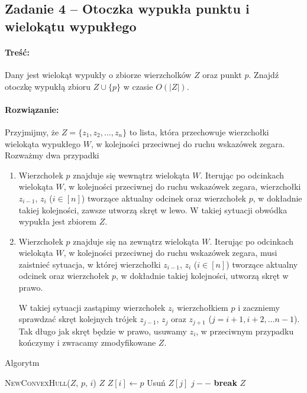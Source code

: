\subsection{Zadanie 4 -- Otoczka wypukła punktu i wielokątu wypukłego}
\paragraph{Treść:} Dany jest wielokąt wypukły o zbiorze wierzcholków $Z$ oraz punkt $p$. Znajdź otoczkę wypukłą zbioru $Z \cup \{p\}$ w czasie $O(|Z|)$.
\paragraph{Rozwiązanie:}
Przyjmijmy, że $Z = \{z_1, z_2, \ldots, z_n\}$ to lista, która przechowuje wierzchołki
wielokąta wypukłego $W$, w kolejności przeciwnej do ruchu wskazówek zegara.
Rozważmy dwa przypadki
\begin{enumerate}
	\item Wierzchołek $p$ znajduje się wewnątrz wielokąta $W$. Iterując po odcinkach
	wielokąta $W$, w kolejności przeciwnej do ruchu wskazówek zegara, wierzchołki
	$z_{i-1}$, $z_i$ ($i \in [n]$) tworzące aktualny odcinek oraz wierzchołek $p$, w dokładnie takiej kolejności, zawsze utworzą skręt w lewo. W takiej sytuacji obwódka wypukła jest zbiorem $Z$.
	
	\item Wierzchołek $p$ znajduje się na zewnątrz wielokąta $W$. Iterując po odcinkach
	wielokąta $W$, w kolejności przeciwnej do ruchu wskazówek zegara, musi zaistnieć sytuacja, w której wierzchołki
	$z_{i-1}$, $z_i$ ($i \in [n]$) tworzące aktualny odcinek oraz wierzchołek $p$, w dokładnie takiej kolejności, utworzą skręt w prawo.
	
	W takiej sytuacji zastąpimy wierzchołek $z_i$ wierzchołkiem $p$ i zaczniemy 
	sprawdzać skręt kolejnych trójek $z_{j-1}$, $z_j$ oraz $z_{j+1}$
	($j = i + 1, i + 2, \dots n - 1$). Tak długo
	jak skręt będzie w prawo, usuwamy $z_i$, w przeciwnym przypadku kończymy i zwracamy zmodyfikowane $Z$.
\end{enumerate}

\begin{algorithm}[H]
	\caption{Algorytm }
	\begin{algorithmic}[1]
		\State \Return \textsc{NewConvexHull}($Z$, $p$, $i$)
		\EndIf
		\EndFor
		\State \Return $Z$
		\EndProcedure		
		\State $Z[i] \gets p$
		\State Usuń $Z[j]$
		\State $j--$ 
		\Else
		\State \textbf{break}
		\EndIf
		\EndFor
		\State \Return $Z$
		\EndProcedure
	\end{algorithmic}
\end{algorithm}